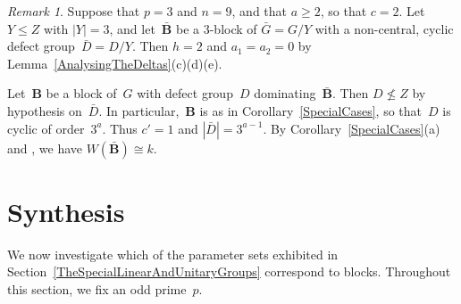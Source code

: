 \documentclass[12pt]{amsart}
\newcommand{\bB}{{\mathbf{B}}}
\def\SU{ \text{\rm SU} }
\theoremstyle{theorem}
\theoremstyle{definition}
\theoremstyle{remark}
\newtheorem{rem}[thm]{Remark}
\begin{document}
\begin{rem}
\label{SpecialCasesRem}
%
Suppose that $p = 3$ and $n = 9$, and that $a \geq 2$, so that $c = 2$.
Let $Y \leq Z$ with $|Y| = 3$, and let~$\bar{\bB}$ be a $3$-block of 
$\bar{G} = G/Y$ with a non-central, cyclic defect group~$\bar{D} = D/Y$. Then 
$h = 2$ and $a_1 = a_2 = 0$ by Lemma~\ref{AnalysingTheDeltas}(c)(d)(e). 

Let~$\bB$ be a block of~$G$ with defect group~$D$ dominating~$\bar{\bB}$. Then 
$D \not\leq Z$ by hypothesis on~$\bar{D}$. In particular,~$\bB$ is as in 
Corollary~\ref{SpecialCases}, so that~$D$ is cyclic of order~$3^a$. Thus 
$c' = 1$ and $|\bar{D}| = 3^{a-1}$. By Corollary~\ref{SpecialCases}(a) and 
\cite[Lemma~$2.4.2$(c)]{HL25}, we have $W( \bar{\bB} ) \cong k$. 
%
\end{rem}

\section{Synthesis}\label{sec:Synthesis}%
\label{Existence} 
We now investigate which of the parameter sets exhibited in 
Section~\ref{TheSpecialLinearAndUnitaryGroups} correspond to blocks.
Throughout this section, we fix an odd prime~$p$.
\end{document}
